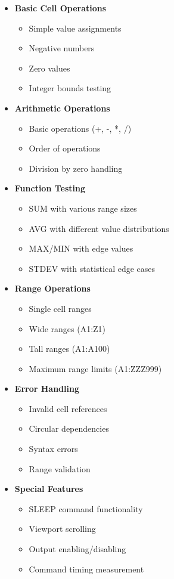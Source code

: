 \documentclass{article}
\begin{document}
\begin{itemize}
    \item \textbf{Basic Cell Operations}
    \begin{itemize}
        \item Simple value assignments
        \item Negative numbers
        \item Zero values
        \item Integer bounds testing
    \end{itemize}

    \item \textbf{Arithmetic Operations}
    \begin{itemize}
        \item Basic operations (+, -, *, /)
        \item Order of operations
        \item Division by zero handling
    \end{itemize}

    \item \textbf{Function Testing}
    \begin{itemize}
        \item SUM with various range sizes
        \item AVG with different value distributions
        \item MAX/MIN with edge values
        \item STDEV with statistical edge cases
    \end{itemize}

    \item \textbf{Range Operations}
    \begin{itemize}
        \item Single cell ranges
        \item Wide ranges (A1:Z1)
        \item Tall ranges (A1:A100)
        \item Maximum range limits (A1:ZZZ999)
    \end{itemize}

    \item \textbf{Error Handling}
    \begin{itemize}
        \item Invalid cell references
        \item Circular dependencies
        \item Syntax errors
        \item Range validation
    \end{itemize}

    \item \textbf{Special Features}
    \begin{itemize}
        \item SLEEP command functionality
        \item Viewport scrolling
        \item Output enabling/disabling
        \item Command timing measurement
    \end{itemize}
\end{itemize}
\end{document}
